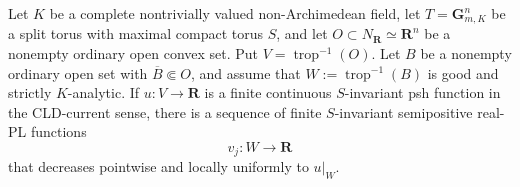 \begin{corollary}
\label{cor:p021-invariant-toric-semipositive-rpl-regularization}
Let \(K\) be a complete nontrivially valued non-Archimedean field, let
\(T=\mathbf G_{m,K}^n\) be a split torus with maximal compact torus \(S\),
and let \(O\subset N_{\mathbf R}\simeq\mathbf R^n\) be a nonempty ordinary
open convex set.  Put \(V=\operatorname{trop}^{-1}(O)\).  Let \(B\) be a
nonempty ordinary open set with \(\overline B\Subset O\), and assume that
\(W:=\operatorname{trop}^{-1}(B)\) is good and strictly \(K\)-analytic.
If \(u:V\to\mathbf R\) is a finite
continuous \(S\)-invariant psh function in the CLD-current sense, there is a
sequence of finite
\(S\)-invariant semipositive real-PL functions
\[
                    v_j:W\longrightarrow\mathbf R
\]
that decreases pointwise and locally uniformly to \(u|_W\).
\end{corollary}
